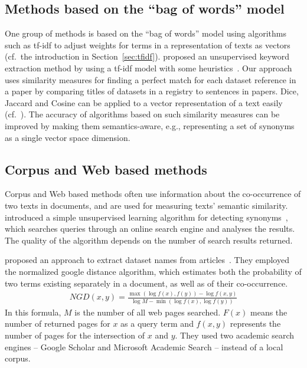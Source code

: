 \documentclass{IOS-Book-Article}
\begin{document}
\subsection{Methods based on the “bag of words” model}
One group of methods is based on the “bag of words” model using algorithms such as tf-idf to adjust weights for terms in a representation of texts as vectors (cf.\ the introduction in Section~\ref{sec:tfidf}).
\citeauthor{Lee2008} proposed an unsupervised keyword extraction method by using a tf-idf model with some heuristics~\citeyearpar{Lee2008}.
Our approach uses similarity measures for finding a perfect match for each dataset reference in a paper by comparing titles of datasets in a registry to sentences in papers.
Dice, Jaccard and Cosine can be applied to a vector representation of a text easily (cf.~\citet{ChristopherD1999}).
The accuracy of algorithms based on such similarity measures can be improved by making them semantics-aware, e.g., representing a set of synonyms as a single vector space dimension.

\subsection{Corpus and Web based methods}
Corpus and Web based methods often use information about the co-occurrence of two texts in documents, and are used for measuring texts' semantic similarity.
\citeauthor{Turney2001} introduced a simple unsupervised learning algorithm for detecting synonyms~\citeyearpar{Turney2001}, which searches queries through an online search engine and analyses the results.
The quality of the algorithm depends on the number of search results returned.  

\citeauthor{sighal2013} proposed an approach to extract dataset names from articles~\citeyearpar{sighal2013}.
They employed the normalized google distance algorithm, which estimates both the probability of two terms existing separately in a document, as well as of their co-occurrence. 
\begin{align*}
	\mathit{NGD}(x,y)=\frac{\max(\log f(x),f(y))-\log f(x,y)}{\log M -\min(\log f(x),\log f(y))}
\end{align*}
In this formula, $M$ is the number of all web pages searched.
$F(x)$ means the number of returned pages for $x$ as a query term and $f(x,y)$ represents the number of pages for the intersection of $x$ and $y$. 
They used two academic search engines -- Google Scholar and Microsoft Academic Search -- instead of a local corpus.
\end{document}
